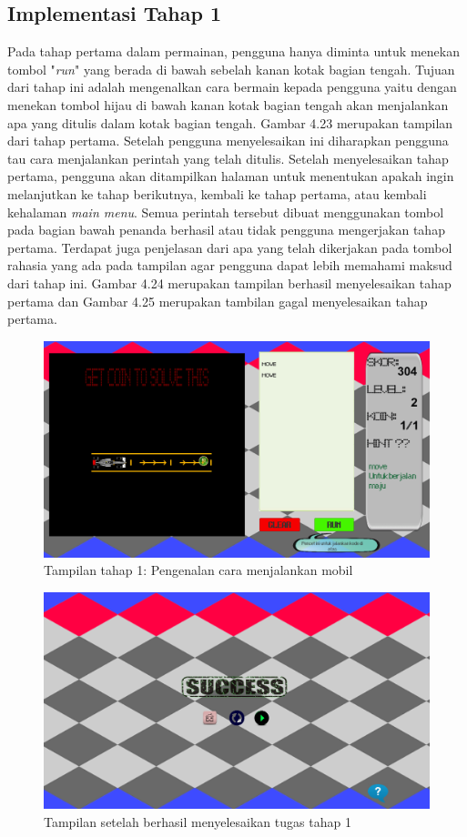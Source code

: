 	\subsection{Implementasi Tahap 1}
	Pada tahap pertama dalam permainan, pengguna hanya diminta untuk menekan tombol "\textit{run}" yang berada di bawah sebelah kanan kotak bagian tengah. Tujuan dari tahap ini adalah mengenalkan cara bermain kepada pengguna yaitu dengan menekan tombol hijau di bawah kanan kotak bagian tengah akan menjalankan apa yang ditulis dalam kotak bagian tengah. Gambar 4.23 merupakan tampilan dari tahap pertama.
	\linebreak\linebreak
	Setelah pengguna menyelesaikan ini diharapkan pengguna tau cara menjalankan perintah yang telah ditulis. Setelah menyelesaikan tahap pertama, pengguna akan ditampilkan halaman untuk menentukan apakah ingin melanjutkan ke tahap berikutnya, kembali ke tahap pertama, atau kembali kehalaman \textit{main menu}. Semua perintah tersebut dibuat menggunakan tombol pada bagian bawah penanda berhasil atau tidak pengguna mengerjakan tahap pertama. Terdapat juga penjelasan dari apa yang telah dikerjakan pada tombol rahasia yang ada pada tampilan agar pengguna dapat lebih memahami maksud dari tahap ini. Gambar 4.24 merupakan tampilan berhasil menyelesaikan tahap pertama dan Gambar 4.25 merupakan tambilan gagal menyelesaikan tahap pertama.
	\begin{figure}
		\centering
		\includegraphics[width=\linewidth-40pt]{pics/prototipe/tahap1}
		\caption{Tampilan tahap 1: Pengenalan cara menjalankan mobil}
	\end{figure}
	\begin{figure}
		\centering
		\includegraphics[width=\linewidth-40pt]{pics/prototipe/ending1}
		\caption{Tampilan setelah berhasil menyelesaikan tugas tahap 1}
	\end{figure}
